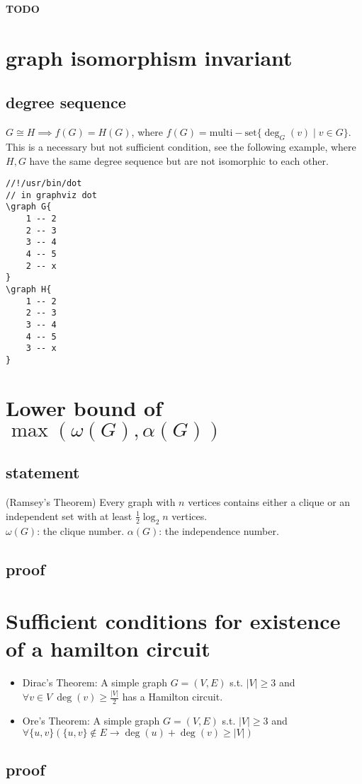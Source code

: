 \documentclass{article}
\begin{document}
\textbf{TODO}



\newpage
\section{graph isomorphism invariant}

\subsection{degree sequence}

$G\cong H\implies f(G)=H(G)$, where $f(G)=\mathrm{multi-set}\{\deg_G(v)\mid v\in G\}$.\\
This is a necessary but not sufficient condition, see the following example, where $H,G$ have the same degree sequence but are not isomorphic to each other.

\begin{verbatim}
//!/usr/bin/dot
// in graphviz dot
\graph G{
	1 -- 2
	2 -- 3
	3 -- 4
	4 -- 5
	2 -- x
}
\graph H{
	1 -- 2
	2 -- 3
	3 -- 4
	4 -- 5
	3 -- x
}
\end{verbatim}


\section{Lower bound of $\max(\omega(G),\alpha(G))$}

\subsection{statement}

(Ramsey's Theorem) Every graph with $n$ vertices contains either a clique or an independent set with at least $\frac{1}{2}\log_2 n$ vertices.\\
$\omega(G)$: the clique number.
$\alpha(G)$: the independence number.

\subsection{proof}

\section{Sufficient conditions for existence of a hamilton circuit }

\begin{itemize}
	\item Dirac's Theorem:
		A simple graph $G=(V,E)$ s.t. $|V|\geq 3$ and $\forall v\in V\ \deg(v)\geq \frac{|V|}{2}$ has a Hamilton circuit.
	\item Ore's Theorem: 
		A simple graph $G=(V,E)$ s.t. $|V|\geq 3$ and $\forall \{u,v\}\left( \{u,v\}\not\in E\rightarrow \deg(u)+\deg(v)\geq |V|\right)$
\end{itemize}

\subsection{proof}
\end{document}
